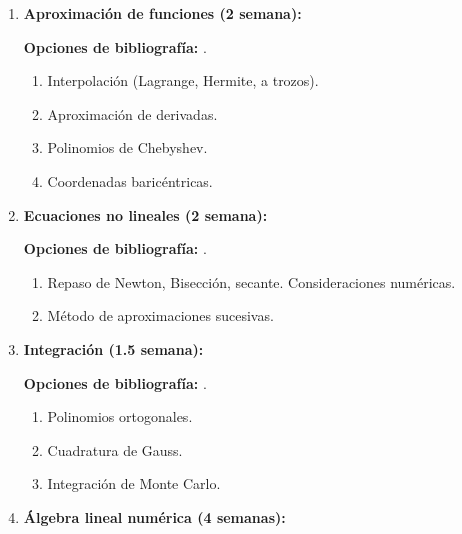 \begin{refsection}
\begin{enumerate}
\begin{enumerate}
	\item Representación de números en aritmética de punto flotante.
	\item Errores por redondeo.
	\item Ejemplos de precisión y estabilidad.
\end{enumerate}

\item \textbf{Aproximación de funciones (2 semana):}

\textbf{Opciones de bibliografía:} \cite{Suli2003,Trefethen2}.

\begin{enumerate}
	\item Interpolación (Lagrange, Hermite, a trozos). 
	\item Aproximación de derivadas.
	\item Polinomios de Chebyshev.
	\item Coordenadas baricéntricas.
\end{enumerate}
	
	
\item \textbf{Ecuaciones no lineales (2 semana):}

\textbf{Opciones de bibliografía:} \cite{Suli2003}.
	
\begin{enumerate}
    \item Repaso de Newton, Bisección, secante. Consideraciones numéricas.
	\item Método de aproximaciones sucesivas.
\end{enumerate}

\item \textbf{Integración (1.5 semana):}

\textbf{Opciones de bibliografía:} \cite{Suli2003}.

\begin{enumerate}
	\item Polinomios ortogonales.
	\item Cuadratura de Gauss.
	\item Integración de Monte Carlo.
\end{enumerate}
	
\item \textbf{Álgebra lineal numérica (4 semanas):}


\end{enumerate}
\end{refsection}

